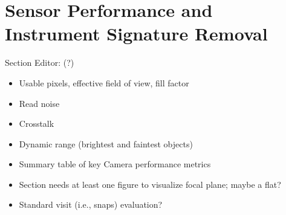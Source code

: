 \section{Sensor Performance and Instrument Signature Removal}
\label{sec:camera}

Section Editor: (?)

\begin{itemize}
    \item Usable pixels, effective field of view, fill factor
    \item Read noise
    \item Crosstalk
    \item Dynamic range (brightest and faintest objects)
    \item Summary table of key Camera performance metrics
    \item Section needs at least one figure to visualize focal plane; maybe a flat?
    \item Standard visit (i.e., snaps) evaluation?
\end{itemize}